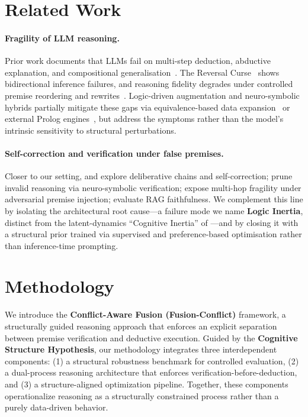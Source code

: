 \documentclass{article} %
\begin{document}
\section{Related Work}

\paragraph{Fragility of LLM reasoning.}
Prior work documents that LLMs fail on multi-step deduction, abductive explanation, and compositional generalisation~\citep{berglund2023reversal,bao2022multi,ijcai2024p693,Cheng2025Em,cheng2026sapp,transformerClark,baoAccess,young-etal-2022-abductionrules,xiong2026scaling,bao2025thesis}. The Reversal Curse~\citep{berglund2023reversal} shows bidirectional inference failures, and reasoning fidelity degrades under controlled premise reordering and rewrites~\citep{baoAccess,bao2025thesis}. Logic-driven augmentation and neuro-symbolic hybrids partially mitigate these gaps via equivalence-based data expansion~\citep{wang-etal-2022-logic,bao2024} or external Prolog engines~\citep{10650138}, but address the symptoms rather than the model's intrinsic sensitivity to structural perturbations.

\paragraph{Self-correction and verification under false premises.}
Closer to our setting, \citet{xiong2025deliberate} and \citet{huang2023large} explore deliberative chains and self-correction; \citet{vericot2026} prune invalid reasoning via neuro-symbolic verification; \citet{multihoax2025} expose multi-hop fragility under adversarial premise injection; \citet{ares2024} evaluate RAG faithfulness. We complement this line by isolating the architectural root cause---a failure mode we name \textbf{Logic Inertia}, distinct from the latent-dynamics ``Cognitive Inertia'' of \citet{lee2026cognitive}---and by closing it with a structural prior trained via supervised and preference-based optimisation rather than inference-time prompting.

\section{Methodology}
\label{sec:method}
We introduce the \textbf{Conflict-Aware Fusion (Fusion-Conflict)} framework, a structurally guided reasoning approach that enforces an explicit separation between premise verification and deductive execution. Guided by the \textbf{Cognitive Structure Hypothesis}, our methodology integrates three interdependent components: 
(1) a structural robustness benchmark for controlled evaluation, 
(2) a dual-process reasoning architecture that enforces verification-before-deduction, and 
(3) a structure-aligned optimization pipeline. 
Together, these components operationalize reasoning as a structurally constrained process rather than a purely data-driven behavior.
\end{document}
